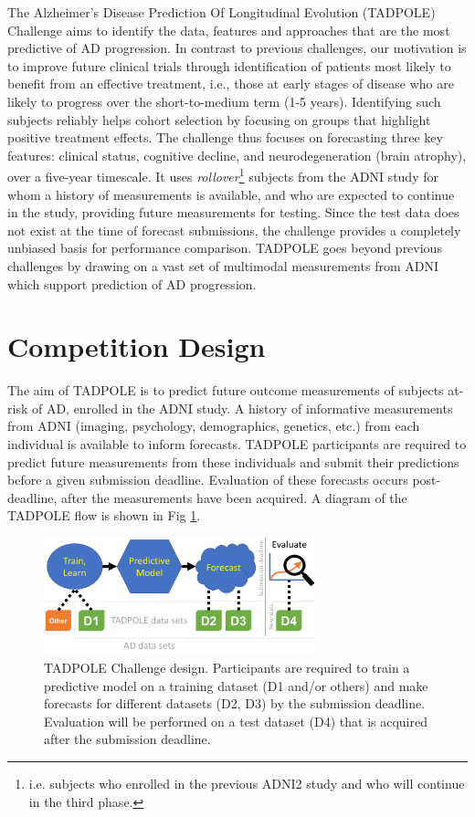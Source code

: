 The Alzheimer's Disease Prediction Of Longitudinal Evolution (TADPOLE) Challenge aims to identify the data, features and approaches that are the most predictive of AD progression. In contrast to previous challenges, our motivation is to improve future clinical trials through identification of patients most likely to benefit from an effective treatment, i.e., those at early stages of disease who are likely to progress over the short-to-medium term (1-5 years). Identifying such subjects reliably helps cohort selection by focusing on groups that highlight positive treatment effects. The challenge thus focuses on forecasting three key features: clinical status, cognitive decline, and neurodegeneration (brain atrophy), over a five-year timescale. It uses \emph{rollover}\footnote{i.e. subjects who enrolled in the previous ADNI2 study and who will continue in the third phase.} subjects from the ADNI study for whom a history of measurements is available, and who are expected to continue in the study, providing future measurements for testing. Since the test data does not exist at the time of forecast submissions, the challenge provides a completely unbiased basis for performance comparison. TADPOLE goes beyond previous challenges by drawing on a vast set of multimodal measurements from ADNI which support prediction of AD progression. 


\section{Competition Design}
\label{design}

The aim of TADPOLE is to predict future outcome measurements of subjects at-risk of AD, enrolled in the ADNI study. A history of informative measurements from ADNI (imaging, psychology, demographics, genetics, etc.) from each individual is available to inform forecasts. TADPOLE participants are required to predict future measurements from these individuals and submit their predictions before a given submission deadline.  Evaluation of these forecasts occurs post-deadline, after the measurements have been acquired. A diagram of the TADPOLE flow is shown in Fig \ref{fig:design}. 

\begin{figure}[h]
 \centering
 \includegraphics[width=0.7\textwidth]{images/challenge_design.png}
 \caption[Diagram showing the TADPOLE Challenge design]{TADPOLE Challenge design. Participants are required to train a predictive model on a training dataset (D1 and/or others) and make forecasts for different datasets (D2, D3) by the submission deadline. Evaluation will be performed on a test dataset (D4) that is acquired after the submission deadline.}
 \label{fig:design}
\end{figure}

